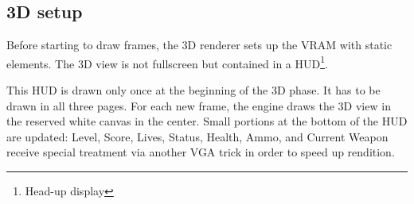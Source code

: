 \subsection{3D setup}
Before starting to draw frames, the 3D renderer sets up the VRAM with static elements. The 3D view is not fullscreen but contained in a HUD\footnote{Head-up display}.
\begin{figure}[H]
  \centering
\end{figure}
This HUD is drawn only once at the beginning of the 3D phase. It has to be drawn in all three pages. For each new frame, the engine draws the 3D view in the reserved white canvas in the center. Small portions at the bottom of the HUD are updated: Level, Score, Lives, Status, Health, Ammo, and Current Weapon receive special treatment via another VGA trick in order to speed up rendition.\\
\par

